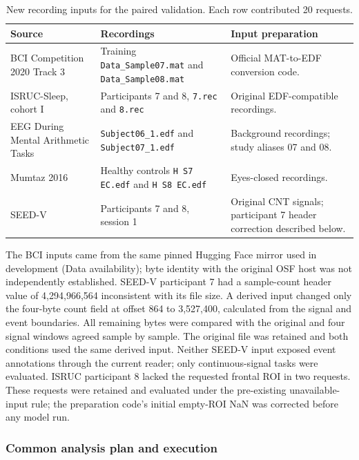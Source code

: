 \begin{table}[!htbp]
\centering\small
\caption{New recording inputs for the paired validation. Each row contributed 20 requests.}
\label{tab:paired-recordings}
\begin{tabular}{>{\raggedright\arraybackslash}p{4.1cm}>{\raggedright\arraybackslash}p{6.1cm}>{\raggedright\arraybackslash}p{4.5cm}}
\toprule
Source & Recordings & Input preparation \\
\midrule
BCI Competition 2020 Track 3 & Training \texttt{Data\_Sample07.mat} and \texttt{Data\_Sample08.mat} & Official MAT-to-EDF conversion code. \\
ISRUC-Sleep, cohort I & Participants 7 and 8, \texttt{7.rec} and \texttt{8.rec} & Original EDF-compatible recordings. \\
EEG During Mental Arithmetic Tasks & \texttt{Subject06\_1.edf} and \texttt{Subject07\_1.edf} & Background recordings; study aliases 07 and 08. \\
Mumtaz 2016 & Healthy controls \texttt{H S7 EC.edf} and \texttt{H S8 EC.edf} & Eyes-closed recordings. \\
SEED-V & Participants 7 and 8, session 1 & Original CNT signals; participant 7 header correction described below. \\
\bottomrule
\end{tabular}
\end{table}

The BCI inputs came from the same pinned Hugging Face mirror used in development (Data availability); byte identity with the original OSF host was not independently established. SEED-V participant 7 had a sample-count header value of 4,294,966,564 inconsistent with its file size. A derived input changed only the four-byte count field at offset 864 to 3,527,400, calculated from the signal and event boundaries. All remaining bytes were compared with the original and four signal windows agreed sample by sample. The original file was retained and both conditions used the same derived input. Neither SEED-V input exposed event annotations through the current reader; only continuous-signal tasks were evaluated. ISRUC participant 8 lacked the requested frontal ROI in two requests. These requests were retained and evaluated under the pre-existing unavailable-input rule; the preparation code's initial empty-ROI NaN was corrected before any model run.

\subsubsection*{Common analysis plan and execution}

